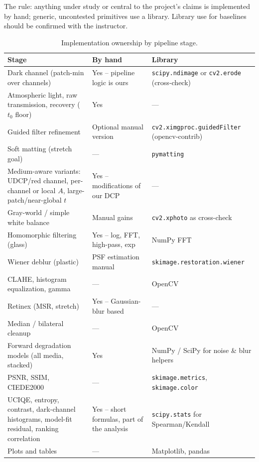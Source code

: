\documentclass[12pt,a4paper]{article}
\begin{document}
The rule: anything under study or central to the project's claims is
implemented by hand; generic, uncontested primitives use a library.
Library use for baselines should be confirmed with the instructor.

\begin{table}[H]
\centering
\small
\begin{tabular}{@{}p{6.3cm}p{3.6cm}p{4.3cm}@{}}
\toprule
Stage & By hand & Library \\
\midrule
Dark channel (patch-min over channels) & Yes -- pipeline logic is ours &
  \texttt{scipy.ndimage} or \texttt{cv2.erode} (cross-check) \\
Atmospheric light, raw transmission, recovery ($t_0$ floor) & Yes & --- \\
Guided filter refinement & Optional manual version &
  \texttt{cv2.ximgproc.guidedFilter} (opencv-contrib) \\
Soft matting (stretch goal) & --- & \texttt{pymatting} \\
Medium-aware variants: UDCP/red channel, per-channel or local $A$,
  large-patch/near-global $t$ & Yes -- modifications of our DCP & --- \\
Gray-world / simple white balance & Manual gains &
  \texttt{cv2.xphoto} as cross-check \\
Homomorphic filtering (glass) & Yes -- log, FFT, high-pass, exp &
  NumPy FFT \\
Wiener deblur (plastic) & PSF estimation manual &
  \texttt{skimage.restoration.wiener} \\
CLAHE, histogram equalization, gamma & --- & OpenCV \\
Retinex (MSR, stretch) & Yes -- Gaussian-blur based & --- \\
Median / bilateral cleanup & --- & OpenCV \\
Forward degradation models (all media, stacked) & Yes &
  NumPy / SciPy for noise \& blur helpers \\
PSNR, SSIM, CIEDE2000 & --- & \texttt{skimage.metrics}, \texttt{skimage.color} \\
UCIQE, entropy, contrast, dark-channel histograms, model-fit residual,
  ranking correlation & Yes -- short formulas, part of the analysis &
  \texttt{scipy.stats} for Spearman/Kendall \\
Plots and tables & --- & Matplotlib, pandas \\
\bottomrule
\end{tabular}
\caption{Implementation ownership by pipeline stage.}
\label{tab:pipeline}
\end{table}
\end{document}
